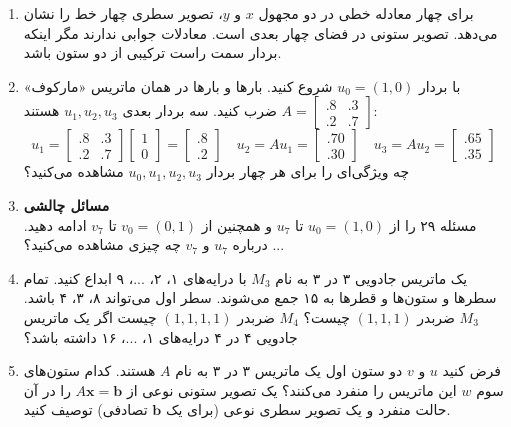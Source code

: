 \documentclass[12pt, a4paper]{book}
\begin{document}
\begin{enumerate}[label=\arabic*.]
		\item
		برای چهار معادله خطی در دو مجهول $x$ و $y$، تصویر سطری چهار خط را نشان می‌دهد. تصویر ستونی در فضای چهار بعدی است. معادلات جوابی ندارند مگر اینکه بردار سمت راست ترکیبی از دو ستون باشد.
		
		\item
		با بردار $u_0=(1,0)$ شروع کنید. بارها و بارها در همان ماتریس «مارکوف» $A = \begin{bmatrix} .8 & .3 \\ .2 & .7 \end{bmatrix}$ ضرب کنید. سه بردار بعدی $u_1, u_2, u_3$ هستند:
		\[ u_1 = \begin{bmatrix} .8 & .3 \\ .2 & .7 \end{bmatrix} \begin{bmatrix} 1 \\ 0 \end{bmatrix} = \begin{bmatrix} .8 \\ .2 \end{bmatrix} \quad u_2 = A u_1 = \begin{bmatrix} .70 \\ .30 \end{bmatrix} \quad u_3 = A u_2 = \begin{bmatrix} .65 \\ .35 \end{bmatrix} \]
		چه ویژگی‌ای را برای هر چهار بردار $u_0, u_1, u_2, u_3$ مشاهده می‌کنید؟
		
		\item
		\textbf{مسائل چالشی} \\
		مسئله ۲۹ را از $u_0=(1,0)$ تا $u_7$ و همچنین از $v_0=(0,1)$ تا $v_7$ ادامه دهید. درباره $u_7$ و $v_7$ چه چیزی مشاهده می‌کنید؟ ...
		
		\item
		یک ماتریس جادویی ۳ در ۳ به نام $M_3$ با درایه‌های ۱، ۲، ...، ۹ ابداع کنید. تمام سطرها و ستون‌ها و قطرها به ۱۵ جمع می‌شوند. سطر اول می‌تواند ۸، ۳، ۴ باشد. $M_3$ ضربدر $(1,1,1)$ چیست؟ $M_4$ ضربدر $(1,1,1,1)$ چیست اگر یک ماتریس جادویی ۴ در ۴ درایه‌های ۱، ...، ۱۶ داشته باشد؟
		
		\item
		فرض کنید $u$ و $v$ دو ستون اول یک ماتریس ۳ در ۳ به نام $A$ هستند. کدام ستون‌های سوم $w$ این ماتریس را منفرد می‌کنند؟ یک تصویر ستونی نوعی از $A\mathbf{x}=\mathbf{b}$ را در آن حالت منفرد و یک تصویر سطری نوعی (برای یک $\mathbf{b}$ تصادفی) توصیف کنید.
		

\end{enumerate}
\end{document}
